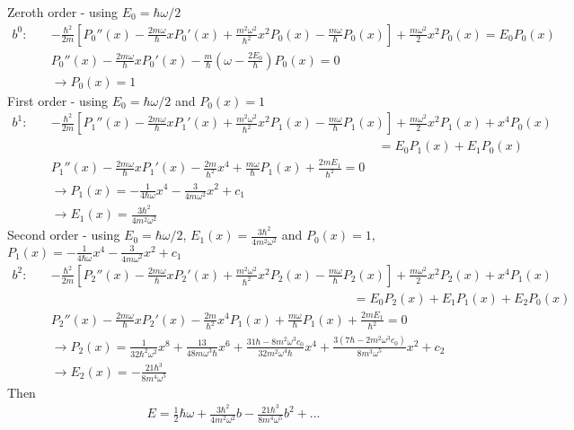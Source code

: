 \documentclass[../main.tex]{subfiles}
\begin{document}
Zeroth order - using $E_0=\hbar\omega/2$
\begin{align}
b^0:\quad &-\frac{\hbar^2}{2m}\left[P_0''(x)-\frac{2m\omega}{\hbar}xP_0'(x)+\frac{m^2\omega^2}{\hbar^2}x^2P_0(x)-\frac{m\omega}{\hbar}P_0(x)\right]+\frac{m\omega^2}{2}x^2P_0(x)=E_0P_0(x)\\
&P_0''(x)-\frac{2m\omega}{\hbar}xP_0'(x)-\frac{m}{\hbar}\left(\omega-\frac{2E_0}{\hbar}\right)P_0(x)=0\\
&\rightarrow P_0(x)=1
\end{align}
First order - using $E_0=\hbar\omega/2$ and $P_0(x)=1$
\begin{align}
b^1:\quad &-\frac{\hbar^2}{2m}\left[P_1''(x)-\frac{2m\omega}{\hbar}xP_1'(x)+\frac{m^2\omega^2}{\hbar^2}x^2P_1(x)-\frac{m\omega}{\hbar}P_1(x)\right]+\frac{m\omega^2}{2}x^2P_1(x)+x^4P_0(x)\\
&\qquad\qquad\qquad\qquad\qquad\qquad\qquad\qquad\qquad\qquad\qquad\qquad\qquad=E_0P_1(x)+E_1P_0(x)\\
&P_1''(x)-\frac{2m\omega}{\hbar}xP_1'(x)-\frac{2m}{\hbar^2}x^4+\frac{m\omega}{\hbar}P_1(x)+\frac{2mE_1}{\hbar^2}=0\\
&\rightarrow P_1(x)=-\frac{1}{4\hbar\omega}x^4-\frac{3}{4m\omega^2}x^2+c_1\\
&\rightarrow E_1(x)=\frac{3\hbar^2}{4m^2\omega^2}
\end{align}
Second order - using $E_0=\hbar\omega/2$, $E_1(x)=\frac{3\hbar^2}{4m^2\omega^2}$ and $P_0(x)=1$, $P_1(x)=-\frac{1}{4\hbar\omega}x^4-\frac{3}{4m\omega^2}x^2+c_1$
\begin{align}
b^2:\quad &-\frac{\hbar^2}{2m}\left[P_2''(x)-\frac{2m\omega}{\hbar}xP_2'(x)+\frac{m^2\omega^2}{\hbar^2}x^2P_2(x)-\frac{m\omega}{\hbar}P_2(x)\right]+\frac{m\omega^2}{2}x^2P_2(x)+x^4P_1(x)\\
&\qquad\qquad\qquad\qquad\qquad\qquad\qquad\qquad\qquad\qquad\qquad\qquad=E_0P_2(x)+E_1P_1(x)+E_2P_0(x)\\
&P_2''(x)-\frac{2m\omega}{\hbar}xP_2'(x)-\frac{2m}{\hbar^2}x^4P_1(x)+\frac{m\omega}{\hbar}P_1(x)+\frac{2mE_1}{\hbar^2}=0\\
&\rightarrow P_2(x)=\frac{1}{32\hbar^2\omega^2}x^8+\frac{13}{48m\omega^3\hbar}x^6+\frac{31\hbar-8m^2\omega^3c_0}{32m^2\omega^4\hbar}x^4+\frac{3(7\hbar-2m^2\omega^3c_0)}{8m^3\omega^5}x^2+c_2\\
&\rightarrow E_2(x)=-\frac{21\hbar^3}{8m^4\omega^5}
\end{align}
Then
\begin{align}
E=\frac{1}{2}\hbar\omega+ \frac{3\hbar^2}{4m^2\omega^2}b-\frac{21\hbar^3}{8m^4\omega^5}b^2+...
\end{align}
\end{document}
